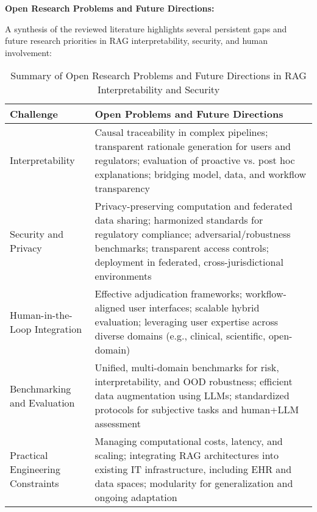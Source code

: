 \documentclass[sigconf]{acmart}
\begin{document}
\textbf{Open Research Problems and Future Directions:}

A synthesis of the reviewed literature highlights several persistent gaps and future research priorities in RAG interpretability, security, and human involvement:

\begin{table*}[htbp]
\centering
\caption{Summary of Open Research Problems and Future Directions in RAG Interpretability and Security}
\label{tab:openproblems}
\begin{adjustbox}{max width=\textwidth}
\begin{tabular}{@{}lp{}@{}}
\toprule
Challenge & Open Problems and Future Directions \\
\midrule
Interpretability & 
Causal traceability in complex pipelines; transparent rationale generation for users and regulators; evaluation of proactive vs. post hoc explanations; bridging model, data, and workflow transparency~\cite{ref27,ref30,ref32,ref33,ref39,ref40,ref41,ref54,ref55} \\
Security and Privacy &
Privacy-preserving computation and federated data sharing; harmonized standards for regulatory compliance; adversarial/robustness benchmarks; transparent access controls; deployment in federated, cross-jurisdictional environments~\cite{ref26,ref32,ref33,ref63,ref64} \\
Human-in-the-Loop Integration &
Effective adjudication frameworks; workflow-aligned user interfaces; scalable hybrid evaluation; leveraging user expertise across diverse domains (e.g., clinical, scientific, open-domain)~\cite{ref5,ref8,ref13,ref30,ref39,ref40,ref41,ref53,ref54,ref55,ref63,ref64} \\
Benchmarking and Evaluation &
Unified, multi-domain benchmarks for risk, interpretability, and OOD robustness; efficient data augmentation using LLMs; standardized protocols for subjective tasks and human+LLM assessment~\cite{ref26,ref32,ref33,ref50,ref51,ref52,ref54,ref55,ref63,ref64} \\
Practical Engineering Constraints &
Managing computational costs, latency, and scaling; integrating RAG architectures into existing IT infrastructure, including EHR and data spaces; modularity for generalization and ongoing adaptation~\cite{ref3,ref5,ref10,ref29,ref32,ref33,ref36,ref63,ref64} \\
\bottomrule
\end{tabular}
\end{adjustbox}
\end{table*}
\end{document}

